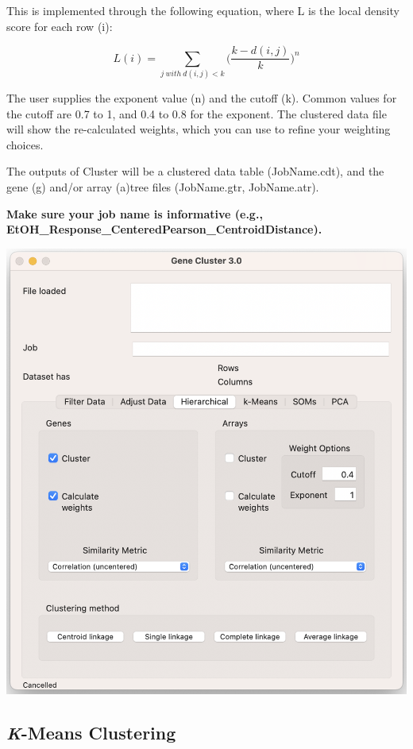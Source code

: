 \documentclass[
]{book}
\begin{document}
This is implemented through the following equation, where L is the local density score for each row (i):

\[
L(i) = \sum_{j\ with\ d(i,j)<k} \bigg(\frac{k-d(i,j)}{k}\bigg)^n
\]

The user supplies the exponent value (n) and the cutoff (k). Common values for the cutoff are 0.7 to 1, and 0.4 to 0.8 for the exponent. The clustered data file will show the re-calculated weights, which you can use to refine your weighting choices.

The outputs of Cluster will be a clustered data table (JobName.cdt), and the gene (g) and/or array (a)tree files (JobName.gtr, JobName.atr).

\textbf{Make sure your job name is informative (e.g., EtOH\_Response\_CenteredPearson\_CentroidDistance).}

\includegraphics[width=16.89in]{figures/Calculating_Weights}

\hypertarget{k-means-clustering}{%
\subsection{\texorpdfstring{\emph{K}-Means Clustering}{K-Means Clustering}}\label{k-means-clustering}}
\end{document}
